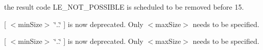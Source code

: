 \begin{DoxyRefList}
the result code L\+E\+\_\+\+N\+O\+T\+\_\+\+P\+O\+S\+S\+I\+B\+LE is scheduled to be removed before 15. 
\item[\label{deprecated__deprecated000006}%
\hypertarget{deprecated__deprecated000006}{}%
Global \hyperlink{le__thread_8h_aed0052d639c1f811b87666dfe1d35d8e}{L\+E\+\_\+\+T\+H\+R\+E\+A\+D\+\_\+\+P\+R\+I\+O\+R\+I\+T\+Y\+\_\+\+N\+O\+R\+M\+AL} ]
\item[\label{deprecated__deprecated000001}%
\hypertarget{deprecated__deprecated000001}{}%
Page \hyperlink{apiFilesSyntax}{Syntax} ]\mbox{[} $<$min\+Size$>$ \char`\"{}..\char`\"{} \mbox{]} is now deprecated. Only $<$max\+Size$>$ needs to be specified.

\mbox{[} $<$min\+Size$>$ \char`\"{}..\char`\"{} \mbox{]} is now deprecated. Only $<$max\+Size$>$ needs to be specified.
\end{DoxyRefList}